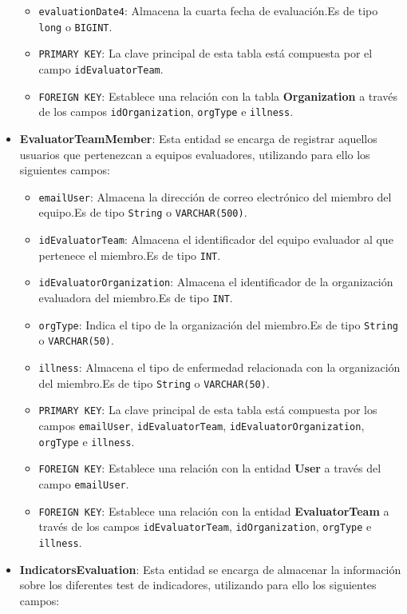 \begin{itemize}
\begin{itemize}
        \item \texttt{evaluationDate4}: Almacena la cuarta fecha de evaluación.Es de tipo \texttt{long} o \texttt{BIGINT}.
        \item \texttt{PRIMARY KEY}: La clave principal de esta tabla está compuesta por el campo \texttt{idEvaluatorTeam}.
        \item \texttt{FOREIGN KEY}: Establece una relación con la tabla \textbf{Organization} a través de los campos \texttt{idOrganization}, \texttt{orgType} e \texttt{illness}.
        \end{itemize}
    \item \textbf{EvaluatorTeamMember}: Esta entidad se encarga de registrar aquellos usuarios que pertenezcan a equipos evaluadores, utilizando para ello los siguientes campos:
    \begin{itemize}
      \item \texttt{emailUser}: Almacena la dirección de correo electrónico del miembro del equipo.Es de tipo \texttt{String} o \texttt{VARCHAR(500)}.
      \item \texttt{idEvaluatorTeam}: Almacena el identificador del equipo evaluador al que pertenece el miembro.Es de tipo \texttt{INT}.
      \item \texttt{idEvaluatorOrganization}: Almacena el identificador de la organización evaluadora del miembro.Es de tipo \texttt{INT}.
      \item \texttt{orgType}: Indica el tipo de la organización del miembro.Es de tipo \texttt{String} o \texttt{VARCHAR(50)}.
      \item \texttt{illness}: Almacena el tipo de enfermedad relacionada con la organización del miembro.Es de tipo \texttt{String} o \texttt{VARCHAR(50)}.
      \item \texttt{PRIMARY KEY}: La clave principal de esta tabla está compuesta por los campos \texttt{emailUser}, \texttt{idEvaluatorTeam}, \texttt{idEvaluatorOrganization}, \texttt{orgType} e \texttt{illness}.
      \item \texttt{FOREIGN KEY}: Establece una relación con la entidad \textbf{User} a través del campo \texttt{emailUser}.
      \item \texttt{FOREIGN KEY}: Establece una relación con la entidad \textbf{EvaluatorTeam} a través de los campos \texttt{idEvaluatorTeam}, \texttt{idOrganization}, \texttt{orgType} e \texttt{illness}.
    \end{itemize}
    \item \textbf{IndicatorsEvaluation}: Esta entidad se encarga de almacenar la información sobre los diferentes test de indicadores, utilizando para ello los siguientes campos:

\end{itemize}
